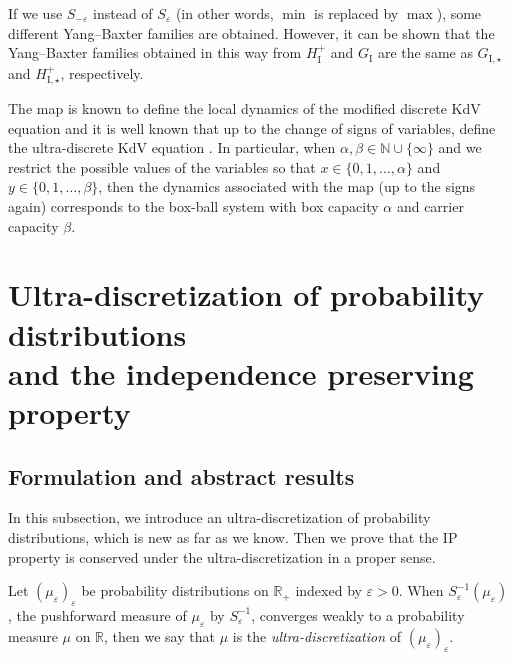 \documentclass[pdftex]{sigma}
\numberwithin{equation}{section}
\def\R{\mathbb{R}}
\def\e{\varepsilon}
\def\N{{\mathbb{N}}}
\def\a{{\alpha}}
\def\b{{\beta}}
\begin{document}
\begin{Remark}
If we use $S_{-\varepsilon}$ instead of $S_{\varepsilon}$
(in other words, $\min$ is replaced by $\max$),
some different Yang--Baxter families are obtained.
However, it can be shown that
the Yang--Baxter families obtained in this way from
$H_{\mathrm{I}}^+$ and $G_{\mathrm{I}}$ are the same as $G_{\mathrm{I},\star}$ and $H_{\mathrm{I},\star}^+$, respectively.
\end{Remark}

\begin{Remark}\label{rem:bbs}
The map \smash{$H_{\mathrm{III}}^{B,\a,\b}$} is known to define the local dynamics of the modified discrete KdV equation \cite{PTV} and it is well known that up to the change of signs of variables, \smash{$H_{\mathrm{III},\star}^{B,\a,\b}$} define the ultra-discrete KdV equation \cite{KNW2, KNW}. In particular, when $\a,\b \in \N \cup \{\infty\}$ and we restrict the possible values of the variables so that
$x \in \{0,1,\dots,\a\}$ and $y \in \{0,1,\dots,\b\}$, then the dynamics associated with the map \smash{$H_{\mathrm{III},\star}^{B,\a,\b}$} (up to the signs again) corresponds to the box-ball system with box capacity $\a$ and carrier capacity $\b$.
\end{Remark}


\section[Ultra-discretization of probability distributions and the independence preserving property]{Ultra-discretization of probability distributions\\ and the independence preserving property}\label{section3}

\subsection{Formulation and abstract results}

In this subsection, we introduce an ultra-discretization of probability distributions, which is new as far as we know. Then we prove that the IP property is conserved under the ultra-discretization in a proper sense.

\begin{Definition}
 Let $(\mu_{\e})_{\e}$ be probability distributions on $\R_+$ indexed by $\e >0$. When $S_{\e}^{-1}(\mu_{\e})$, the pushforward measure of $\mu_{\e}$ by $S_{\e}^{-1}$, converges weakly to a probability measure $\mu$ on $\R$, then we say that $\mu$ is the {\it ultra-discretization} of $(\mu_{\e})_{\e}$. %
 \end{Definition}
\end{document}
